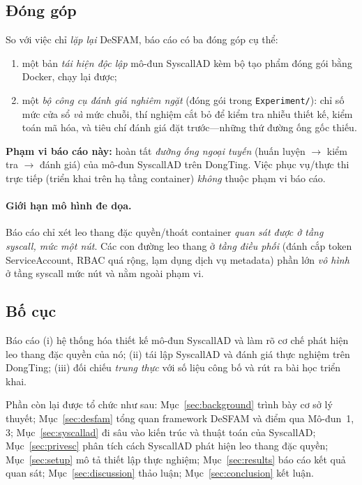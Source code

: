 \subsection{Đóng góp}
So với việc chỉ \emph{lặp lại} DeSFAM, báo cáo có ba đóng góp cụ thể:
\begin{enumerate}[label=(\arabic*),leftmargin=2.0em]
  \item một bản \emph{tái hiện độc lập} mô-đun SyscallAD kèm bộ tạo phẩm đóng gói
        bằng Docker, chạy lại được;
  \item một \emph{bộ công cụ đánh giá nghiêm ngặt} (đóng gói trong
        \texttt{Experiment/}): chỉ số mức cửa sổ \emph{và} mức chuỗi, thí nghiệm cắt
        bỏ để kiểm tra nhiễu thiết kế, kiểm toán mã hóa, và tiêu chí đánh giá đặt
        trước---những thứ đường ống gốc thiếu.
\end{enumerate}

\noindent\textbf{Phạm vi báo cáo này:} hoàn tất \emph{đường ống ngoại tuyến}
(huấn luyện $\to$ kiểm tra $\to$ đánh giá) của mô-đun SyscallAD trên DongTing. Việc
phục vụ/thực thi trực tiếp (triển khai trên hạ tầng container) \emph{không} thuộc
phạm vi báo cáo.

\paragraph{Giới hạn mô hình đe dọa.} Báo cáo chỉ xét leo thang đặc quyền/thoát
container \emph{quan sát được ở tầng syscall, mức một nút}. Các con đường leo thang
ở \emph{tầng điều phối} (đánh cắp token ServiceAccount, RBAC quá rộng, lạm dụng dịch
vụ metadata) phần lớn \emph{vô hình} ở tầng syscall mức nút và nằm ngoài phạm vi.

\subsection{Bố cục}
Báo cáo (i) hệ thống hóa thiết kế mô-đun SyscallAD và làm rõ cơ chế phát hiện leo
thang đặc quyền của nó; (ii) tái lập SyscallAD và đánh giá thực nghiệm trên DongTing;
(iii) đối chiếu \emph{trung thực} với số liệu công bố và rút ra bài học triển khai.

Phần còn lại được tổ chức như sau: Mục~\ref{sec:background} trình bày cơ sở lý
thuyết; Mục~\ref{sec:desfam} tổng quan framework DeSFAM và điểm qua Mô-đun~1, 3;
Mục~\ref{sec:syscallad} đi sâu vào kiến trúc và thuật toán của SyscallAD;
Mục~\ref{sec:privesc} phân tích cách SyscallAD phát hiện leo thang đặc quyền;
Mục~\ref{sec:setup} mô tả thiết lập thực nghiệm; Mục~\ref{sec:results} báo cáo kết
quả quan sát; Mục~\ref{sec:discussion} thảo luận; Mục~\ref{sec:conclusion} kết luận.
